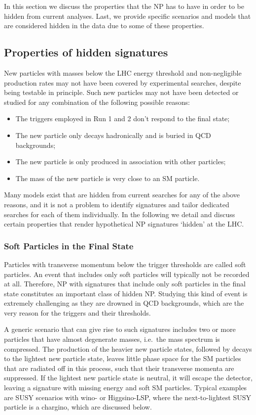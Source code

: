 \documentclass[10pt]{article}
\begin{document}
In this section we discuss the properties that the NP has to have in order to be hidden from current analyses.
Last, we provide specific scenarios and models that are considered hidden in the data due to some of these properties.



\subsection{Properties of hidden signatures}
%
New particles with masses below the LHC energy threshold and non-negligible production rates may not have been covered by experimental searches, despite being testable in principle.
Such new particles may not have been detected or studied for any combination of the following possible reasons:
%
\begin{itemize}
	\item The triggers employed in Run 1 and 2 don't respond to the final state;
	\item The new particle only decays hadronically and is buried in
	QCD backgrounds;
	\item The new particle is only produced in association with other particles;
	\item The mass of the new particle is very close to an SM particle.
\end{itemize}
%
Many models exist that are hidden from current searches for any of the above reasons, and it is not a problem to identify signatures and tailor dedicated searches for each of them individually.
In the following we detail and discuss certain properties that render hypothetical NP signatures `hidden' at the LHC.


\subsubsection{Soft Particles in the Final State}
%
Particles with transverse momentum below the trigger thresholds are called soft particles.
An event that includes only soft particles will typically not be recorded at all.
Therefore, NP with signatures that include only soft particles in the final state constitutes an important class of hidden NP.
Studying this kind of event is extremely challenging as they are drowned in QCD backgrounds, which are the very reason for the triggers and their thresholds.

A generic scenario that can give rise to such signatures includes two or more particles that have almost degenerate masses, i.e.\ the mass spectrum is compressed.
The production of the heavier new particle states, followed by decays to the lightest new particle state, leaves little phase space for the SM particles that are radiated off in this process, such that their transverse momenta are suppressed.
If the lightest new particle state is neutral, it will escape the detector, leaving a signature with missing energy and soft SM particles.
Typical examples are SUSY scenarios with wino- or Higgsino-LSP, where the next-to-lightest SUSY particle is a chargino, which are discussed below.
\end{document}
